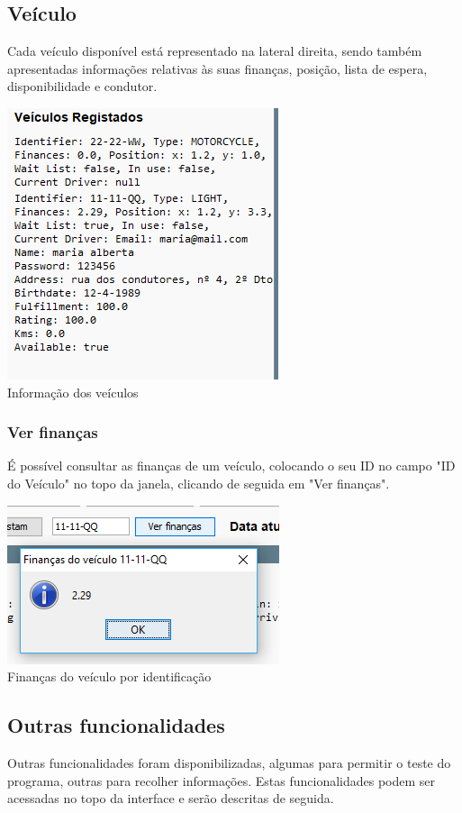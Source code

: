 \documentclass[a4paper]{article}
\begin{document}
\subsection{Veículo}
Cada veículo disponível está representado na lateral direita, sendo também apresentadas informações relativas às suas finanças, posição, lista de espera, disponibilidade e condutor.
\begin{center}
  \includegraphics[scale=0.75]{veiculo_info}\\
  \caption{Informação dos veículos}
  \label{fig:picture}
\end{center}
\subsubsection{Ver finanças}
É possível consultar as finanças de um veículo, colocando o seu ID no campo "ID do Veículo" no topo da janela, clicando de seguida em "Ver finanças".
\begin{center}
  \includegraphics[scale=0.75]{veiculo_financas}\\
  \caption{Finanças do veículo por identificação}
  \label{fig:picture}
\end{center}

\subsection{Outras funcionalidades}
Outras funcionalidades foram disponibilizadas, algumas para permitir o teste do programa, outras para recolher informações. Estas funcionalidades podem ser acessadas no topo da interface e serão descritas de seguida.
\end{document}
